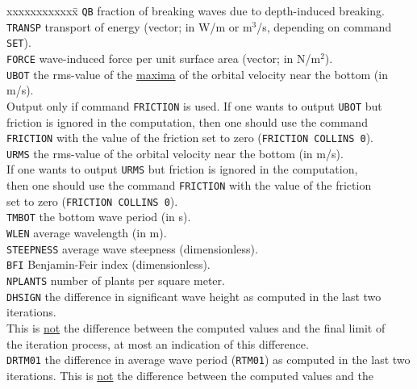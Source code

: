 \documentclass[12pt]{book}
\begin{document}
\begin{tabbing}
 xxxxxxxxxxxx\= \kill
{\tt QB}     \> fraction of breaking waves due to depth-induced breaking.\\
{\tt TRANSP} \> transport of energy (vector; in W/m or m$^3$/s, depending on command {\tt SET}).\\
{\tt FORCE}  \> wave-induced force per unit surface area (vector; in N/m$^2$).\\
{\tt UBOT}   \> the rms-value of the \underline{maxima} of the orbital velocity near the bottom (in m/s).\+\\
                Output only if command {\tt FRICTION} is used. If one wants to output {\tt UBOT} but\\
                friction is ignored in the computation, then one should use the command\\
                {\tt FRICTION} with the value of the friction set to zero ({\tt FRICTION COLLINS 0}).\-\\
{\tt URMS}   \> the rms-value of the orbital velocity near the bottom (in m/s).\+\\
                If one wants to output {\tt URMS} but friction is ignored in the computation,\\
                then one should use the command {\tt FRICTION} with the value of the friction\\
                set to zero ({\tt FRICTION COLLINS 0}).\-\\
{\tt TMBOT}  \> the bottom wave period (in s).\\
{\tt WLEN}   \> average wavelength (in m).\\
{\tt STEEPNESS} \> average wave steepness (dimensionless).\\
{\tt BFI}    \> Benjamin-Feir index (dimensionless).\\
{\tt NPLANTS} \> number of plants per square meter.\\
{\tt DHSIGN} \> the difference in significant wave height as computed in the last two iterations.\+\\
                This is \underline{not} the difference between the computed values and the final limit of\\
                the iteration process, at most an indication of this difference.\-\\
{\tt DRTM01} \> the difference in average wave period ({\tt RTM01}) as computed in the last two\+\\
                iterations. This is \underline{not} the difference between the computed values and the\\

\end{tabbing}
\end{document}
